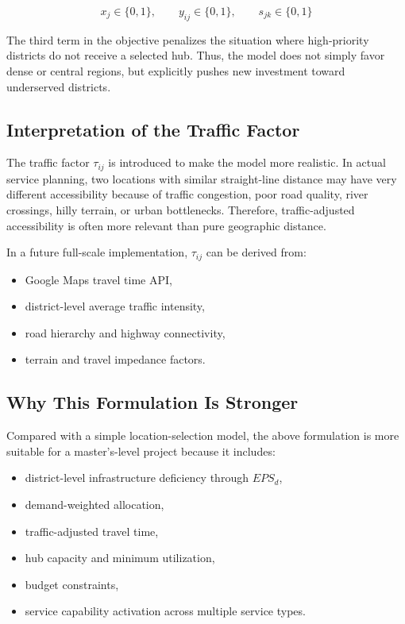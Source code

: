 \begin{equation}
x_j \in \{0,1\}, \qquad y_{ij} \in \{0,1\}, \qquad s_{jk} \in \{0,1\}
\end{equation}

The third term in the objective penalizes the situation where high-priority districts do not receive a selected hub. Thus, the model does not simply favor dense or central regions, but explicitly pushes new investment toward underserved districts.

\subsection{Interpretation of the Traffic Factor}

The traffic factor $\tau_{ij}$ is introduced to make the model more realistic. In actual service planning, two locations with similar straight-line distance may have very different accessibility because of traffic congestion, poor road quality, river crossings, hilly terrain, or urban bottlenecks. Therefore, traffic-adjusted accessibility is often more relevant than pure geographic distance.

In a future full-scale implementation, $\tau_{ij}$ can be derived from:
\begin{itemize}
    \item Google Maps travel time API,
    \item district-level average traffic intensity,
    \item road hierarchy and highway connectivity,
    \item terrain and travel impedance factors.
\end{itemize}

\subsection{Why This Formulation Is Stronger}

Compared with a simple location-selection model, the above formulation is more suitable for a master's-level project because it includes:
\begin{itemize}
    \item district-level infrastructure deficiency through $EPS_d$,
    \item demand-weighted allocation,
    \item traffic-adjusted travel time,
    \item hub capacity and minimum utilization,
    \item budget constraints,
    \item service capability activation across multiple service types.
\end{itemize}


